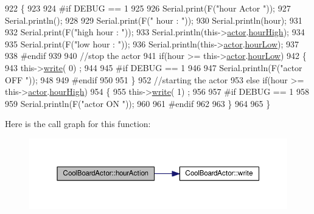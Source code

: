 \begin{DoxyCode}
922 \{
923 
924 \textcolor{preprocessor}{#if DEBUG == 1}
925     
926     Serial.print(F(\textcolor{stringliteral}{"hour Actor "}));
927     Serial.println();
928 
929     Serial.print(F(\textcolor{stringliteral}{" hour : "}));
930     Serial.println(hour);
931 
932     Serial.print(F(\textcolor{stringliteral}{"high hour : "}));
933     Serial.println(this->\hyperlink{class_cool_board_actor_a8f190db9f7a39fddbcef7f152da970e9}{actor}.\hyperlink{struct_cool_board_actor_1_1state_acd1af3ac2382258a5b05497d814adc01}{hourHigh});
934 
935     Serial.print(F(\textcolor{stringliteral}{"low hour : "}));
936     Serial.println(this->\hyperlink{class_cool_board_actor_a8f190db9f7a39fddbcef7f152da970e9}{actor}.\hyperlink{struct_cool_board_actor_1_1state_ae7034bf95b36f1392f9de076fa0c8c0f}{hourLow});
937 
938 \textcolor{preprocessor}{#endif}
939 
940     \textcolor{comment}{//stop the actor    }
941     \textcolor{keywordflow}{if}(hour >= this->\hyperlink{class_cool_board_actor_a8f190db9f7a39fddbcef7f152da970e9}{actor}.\hyperlink{struct_cool_board_actor_1_1state_ae7034bf95b36f1392f9de076fa0c8c0f}{hourLow})
942     \{
943         this->\hyperlink{class_cool_board_actor_a958786ff01ea1056ee72c72d439f86da}{write}( 0) ;
944 
945 \textcolor{preprocessor}{    #if DEBUG == 1 }
946 
947         Serial.println(F(\textcolor{stringliteral}{"actor OFF "}));
948 
949 \textcolor{preprocessor}{    #endif  }
950 
951     \}
952     \textcolor{comment}{//starting the actor}
953     \textcolor{keywordflow}{else} \textcolor{keywordflow}{if}(hour >= this->\hyperlink{class_cool_board_actor_a8f190db9f7a39fddbcef7f152da970e9}{actor}.\hyperlink{struct_cool_board_actor_1_1state_acd1af3ac2382258a5b05497d814adc01}{hourHigh})
954     \{
955         this->\hyperlink{class_cool_board_actor_a958786ff01ea1056ee72c72d439f86da}{write}( 1) ;
956 
957 \textcolor{preprocessor}{    #if DEBUG == 1 }
958 
959         Serial.println(F(\textcolor{stringliteral}{"actor ON "}));
960 
961 \textcolor{preprocessor}{    #endif  }
962     
963     \}
964 
965 \}
\end{DoxyCode}
Here is the call graph for this function\+:\nopagebreak
\begin{figure}[H]
\begin{center}
\leavevmode
\includegraphics[width=350pt]{dc/d69/class_cool_board_actor_adf3b4e15b9d73681082112adf8ef95cb_cgraph}
\end{center}
\end{figure}
